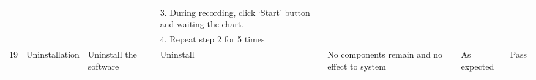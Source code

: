 \documentclass{article}
\begin{document}
\begin{longtable}{|p{10pt}|p{60pt}|p{95pt}|p{130pt}|p{60pt}|p{55pt}|p{25pt}|}
                    &                                       &                                                                                                                           & 3.    During recording, click ‘Start’ button and waiting the chart.                              &                                                                                                        &                                                           &                       \\ \cline{4-4}
                    &                                       &                                                                                                                           & 4.    Repeat step 2 for 5 times                                                                  &                                                                                                        &                                                           &                       \\ \hline
19                  & Uninstallation                        & Uninstall the software                                                                                                    & Uninstall                                                                                        & No components remain and no effect to system                                                           & As expected                                               & Pass                  \\ \hline
\end{longtable}
\end{document}
